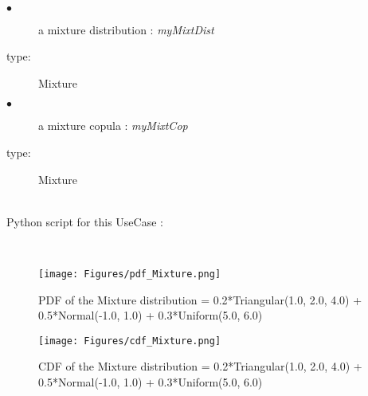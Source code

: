 \textspace\\
\noindent%
             {
               \begin{description}
               \item[$\bullet$] a mixture distribution : {\itshape myMixtDist}
               \item[type:] Mixture
               \item[$\bullet$] a mixture copula : {\itshape myMixtCop}
               \item[type:] Mixture
               \end{description}
             }

             \textspace\\
             Python script for this UseCase :


             \textspace\\


             \begin{figure}[H]
               \begin{center}
                 \texttt{[image: Figures/pdf\_Mixture.png]}
                 \caption{PDF of the Mixture distribution = 0.2*Triangular(1.0, 2.0, 4.0) + 0.5*Normal(-1.0, 1.0) + 0.3*Uniform(5.0, 6.0)}
                 \label{mixtureGraphPDF}
               \end{center}
             \end{figure}

             \begin{figure}[H]
               \begin{center}
                 \texttt{[image: Figures/cdf\_Mixture.png]}
                 \caption{CDF of the Mixture distribution = 0.2*Triangular(1.0, 2.0, 4.0) + 0.5*Normal(-1.0, 1.0) + 0.3*Uniform(5.0, 6.0)}
                 \label{mixtureGraphCDF}
               \end{center}
             \end{figure}
